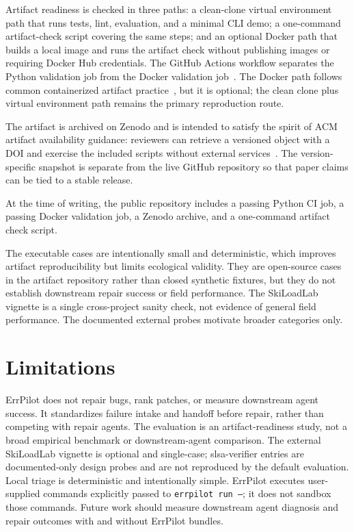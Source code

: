 \documentclass[sigconf]{acmart}
\begin{document}
Artifact readiness is checked in three paths: a clean-clone virtual environment
path that runs tests, lint, evaluation, and a minimal CLI demo; a one-command
artifact-check script covering the same steps; and an optional Docker path that
builds a local image and runs the artifact check without publishing images or
requiring Docker Hub credentials. The GitHub Actions workflow separates the
Python validation job from the Docker validation job~\cite{github-actions}.
The Docker path follows common containerized artifact practice~\cite{docker},
but it is optional; the clean clone plus virtual environment path remains the
primary reproduction route.

The artifact is archived on Zenodo and is intended to satisfy the spirit of ACM
artifact availability guidance: reviewers can retrieve a versioned object with a
DOI and exercise the included scripts without external services~\cite{acm-badging}.
The version-specific snapshot is separate from the live GitHub repository so
that paper claims can be tied to a stable release.

At the time of writing, the public repository includes a passing Python CI job,
a passing Docker validation job, a Zenodo archive, and a one-command artifact
check script.

The executable cases are intentionally small and deterministic, which improves
artifact reproducibility but limits ecological validity. They are open-source
cases in the artifact repository rather than closed synthetic fixtures, but they
do not establish downstream repair success or field performance. The SkiLoadLab
vignette is a single cross-project sanity check, not evidence of general field
performance. The documented external probes motivate broader categories only.

\section{Limitations}

ErrPilot does not repair bugs, rank patches, or measure downstream agent
success. It standardizes failure intake and handoff before repair, rather than
competing with repair agents. The evaluation is an artifact-readiness study, not
a broad empirical benchmark or downstream-agent comparison. The external
SkiLoadLab vignette is optional and single-case; slsa-verifier entries are
documented-only design probes and are not reproduced by the default evaluation.
Local triage is deterministic and intentionally simple. ErrPilot executes
user-supplied commands explicitly passed to \texttt{errpilot run --}; it does
not sandbox those commands. Future work should measure downstream agent
diagnosis and repair outcomes with and without ErrPilot bundles.
\end{document}
